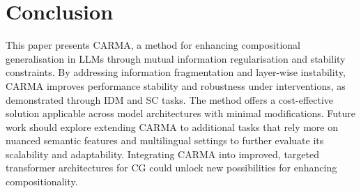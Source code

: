 \section{Conclusion}\label{sec:conclusion}
This paper presents CARMA, a method for enhancing compositional generalisation in LLMs through mutual information regularisation and stability constraints. By addressing information fragmentation and layer-wise instability, CARMA improves performance stability and robustness under interventions, as demonstrated through IDM and SC tasks. The method offers a cost-effective solution applicable across model architectures with minimal modifications. Future work should explore extending CARMA to additional tasks that rely more on nuanced semantic features and multilingual settings to further evaluate its scalability and adaptability. Integrating CARMA into improved, targeted transformer architectures for CG could unlock new possibilities for enhancing compositionality.
